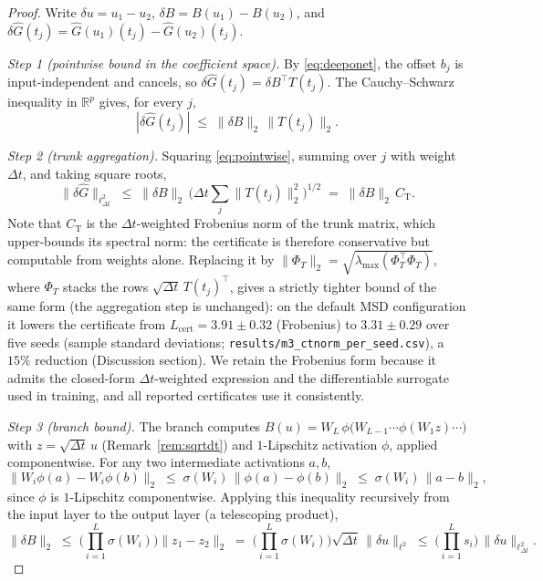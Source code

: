 \documentclass[11pt,sagev,times]{sagej}
\newcommand{\Ghat}{\hat{G}}
\newcommand{\Lhat}{L_{\mathrm{cert}}}
\begin{document}
\begin{proof}
Write $\delta u = u_1-u_2$, $\delta B = B(u_1)-B(u_2)$, and
$\delta\Ghat(t_j) = \Ghat(u_1)(t_j)-\Ghat(u_2)(t_j)$.

\emph{Step 1 (pointwise bound in the coefficient space).} By
\eqref{eq:deeponet}, the offset $b_j$ is input-independent and cancels, so
$\delta\Ghat(t_j) = \delta B^{\top} T(t_j)$. The Cauchy--Schwarz
inequality in $\mathbb{R}^p$ gives, for every $j$,
\begin{equation}
  |\delta\Ghat(t_j)| \;\le\; \|\delta B\|_2\,\|T(t_j)\|_2 .
  \label{eq:pointwise}
\end{equation}

\emph{Step 2 (trunk aggregation).} Squaring \eqref{eq:pointwise}, summing
over $j$ with weight $\Delta t$, and taking square roots,
\begin{equation}
  \|\delta\Ghat\|_{\ell^2_{\Delta t}}
  \;\le\; \|\delta B\|_2\,
  \Big(\Delta t\sum_j \|T(t_j)\|_2^2\Big)^{\!1/2}
  \;=\; \|\delta B\|_2\, C_{\mathrm{T}} .
  \label{eq:trunkbound}
\end{equation}
Note that $C_{\mathrm{T}}$ is the $\Delta t$-weighted Frobenius norm of the
trunk matrix, which upper-bounds its spectral norm: the certificate is
therefore conservative but computable from weights alone. Replacing it by
$\|\Phi_T\|_2=\sqrt{\lambda_{\max}(\Phi_T^{\top}\Phi_T)}$, where
$\Phi_T$ stacks the rows $\sqrt{\Delta t}\,T(t_j)^{\top}$, gives a
strictly tighter bound of the same form (the aggregation step is unchanged):
on the default MSD configuration it lowers the certificate from
$\Lhat=3.91\pm0.32$ (Frobenius) to $3.31\pm0.29$ over five seeds (sample
standard deviations; \texttt{results/m3\_ctnorm\_per\_seed.csv}), a $15\%$
reduction (Discussion section). We retain the Frobenius form
because it admits the closed-form $\Delta t$-weighted expression and the
differentiable surrogate used in training, and all reported certificates use
it consistently.

\emph{Step 3 (branch bound).} The branch computes
$B(u) = W_L\,\phi\!\big(W_{L-1}\cdots\phi(W_1 z)\cdots\big)$ with
$z=\sqrt{\Delta t}\,u$ (Remark~\ref{rem:sqrtdt}) and $1$-Lipschitz
activation $\phi$, applied componentwise. For any two intermediate
activations $a,b$,
\begin{equation}
  \|W_i\phi(a)-W_i\phi(b)\|_2
  \;\le\; \sigma(W_i)\,\|\phi(a)-\phi(b)\|_2
  \;\le\; \sigma(W_i)\,\|a-b\|_2 ,
\end{equation}
since $\phi$ is $1$-Lipschitz componentwise. Applying this inequality
recursively from the input layer to the output layer (a telescoping
product),
\begin{equation}
  \|\delta B\|_2 \;\le\; \Big(\prod_{i=1}^{L}\sigma(W_i)\Big)\|z_1-z_2\|_2
  \;=\; \Big(\prod_{i=1}^{L}\sigma(W_i)\Big)\sqrt{\Delta t}\,\|\delta u\|_{\ell^2}
  \;\le\; \Big(\prod_{i=1}^{L} s_i\Big)\,\|\delta u\|_{\ell^2_{\Delta t}} .
  \label{eq:branchbound}
\end{equation}


\end{proof}
\end{document}
